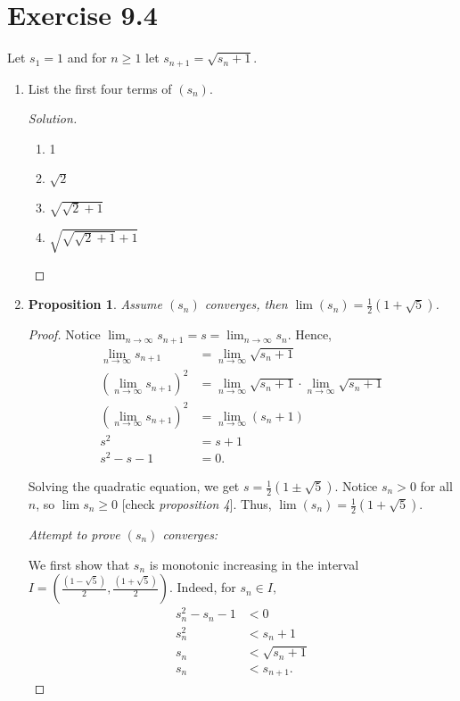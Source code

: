 \documentclass{article}
\newtheorem{proposition}[thm]{Proposition}
\begin{document}
\section*{Exercise 9.4}
Let $s_1=1$ and for $n\ge1$ let $s_{n+1}=\sqrt{s_n+1}$.
\begin{enumerate}[label=(\alph*)]
    \item List the first four terms of $(s_n)$.
    \begin{proof}[Solution]\indent
        \begin{enumerate}[label=\arabic*.]
            \item 1
            \item $\sqrt{2}$
            \item $\sqrt{\sqrt{2}+1}$
            \item $\sqrt{\sqrt{\sqrt{2}+1}+1}$
        \end{enumerate}
    \end{proof}

    \item
    \begin{proposition}
        Assume $(s_n)$ converges, then $\lim (s_n) = \frac{1}{2}\left(1+\sqrt{5}\right)$.
    \end{proposition}
    \begin{proof}
        Notice $\lim_{n\rightarrow\infty}s_{n+1} = s = \lim_{n\rightarrow\infty}s_n$. Hence, 
        \begin{align*}
            \lim_{n\rightarrow\infty} s_{n+1} & = \lim_{n\rightarrow\infty} \sqrt{s_n+1} \\
            \left(\lim_{n\rightarrow\infty} s_{n+1}\right)^2 & = \lim_{n\rightarrow\infty} \sqrt{s_n+1}
            \cdot \lim_{n\rightarrow\infty} \sqrt{s_n+1} \\
            \left(\lim_{n\rightarrow\infty} s_{n+1}\right)^2 & = \lim_{n\rightarrow\infty} (s_n+1) \\ 
            s^2 & = {s+1} \\
            s^2 - s - 1 & = 0.
        \end{align*}

        Solving the quadratic equation, we get $s = \frac{1}{2}\left(1\pm\sqrt{5}\right)$.
        Notice $s_n > 0$ for all $n$, so $\lim s_n\ge 0$ [check \emph{proposition 4}]. Thus, 
        $\lim (s_n) = \frac{1}{2}\left(1+\sqrt{5}\right)$.

        \emph{Attempt to prove $(s_n)$ converges:}

        We first show that $s_n$ is monotonic increasing in the interval 
        $I = \left(\frac{\left(1-\sqrt{5}\right)}{2}, \frac{\left(1+\sqrt{5}\right)}{2}\right)$. 
        Indeed, for $s_n\in I,$
        \begin{align*}
            s_n^2 - s_n - 1 & < 0 \\
            s_n^2 & < s_n + 1 \\
            s_n & < \sqrt{s_n + 1} \\
            s_n & < s_{n+1}.
        \end{align*}


\end{proof}
\end{enumerate}
\end{document}
